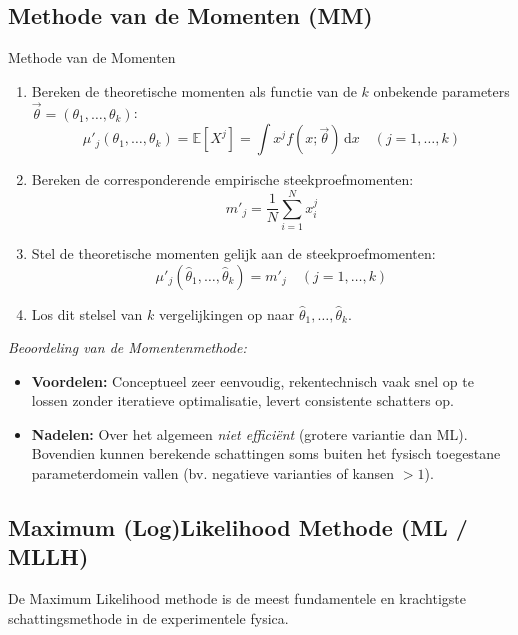 \documentclass[11pt,a4paper]{article}
\newcommand{\E}{\mathbb{E}}
\newcommand{\dd}{\mathrm{d}}
\begin{document}
\subsection{Methode van de Momenten (MM)}
\begin{stappenplan}{Methode van de Momenten}
\begin{enumerate}[leftmargin=1.2em]
    \item Bereken de theoretische momenten als functie van de $k$ onbekende parameters $\vec{\theta} = (\theta_1, \ldots, \theta_k)$:
    \begin{equation}
        \mu'_j(\theta_1, \ldots, \theta_k) = \E[X^j] = \int x^j f(x; \vec{\theta}) \, \dd x \quad (j = 1, \ldots, k)
    \end{equation}
    \item Bereken de corresponderende empirische steekproefmomenten:
    \begin{equation}
        m'_j = \frac{1}{N} \sum_{i=1}^N x_i^j
    \end{equation}
    \item Stel de theoretische momenten gelijk aan de steekproefmomenten:
    \begin{equation}
        \mu'_j(\hat{\theta}_1, \ldots, \hat{\theta}_k) = m'_j \quad (j = 1, \ldots, k)
    \end{equation}
    \item Los dit stelsel van $k$ vergelijkingen op naar $\hat{\theta}_1, \ldots, \hat{\theta}_k$.
\end{enumerate}
\end{stappenplan}

\emph{Beoordeling van de Momentenmethode:}
\begin{itemize}[leftmargin=1.5em]
    \item \textbf{Voordelen:} Conceptueel zeer eenvoudig, rekentechnisch vaak snel op te lossen zonder iteratieve optimalisatie, levert consistente schatters op.
    \item \textbf{Nadelen:} Over het algemeen \emph{niet efficiënt} (grotere variantie dan ML). Bovendien kunnen berekende schattingen soms buiten het fysisch toegestane parameterdomein vallen (bv. negatieve varianties of kansen $> 1$).
\end{itemize}

\subsection{Maximum (Log)Likelihood Methode (ML / MLLH)}
De Maximum Likelihood methode is de meest fundamentele en krachtigste schattingsmethode in de experimentele fysica.
\end{document}
